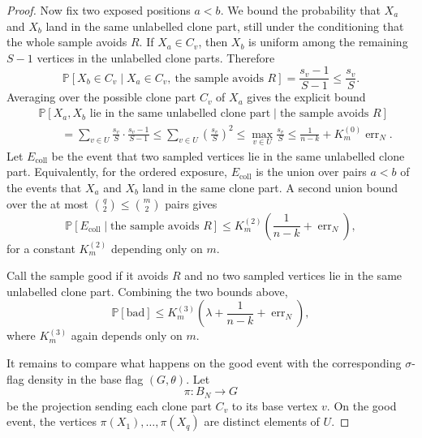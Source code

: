 \documentclass[11pt]{article}
\theoremstyle{definition}
\newcommand{\Prob}{\mathbb{P}}
\begin{document}
\begin{proof}
Now fix two exposed positions $a<b$.  We bound the probability that $X_a$ and
$X_b$ land in the same unlabelled clone part, still under the conditioning
that the whole sample avoids $R$.  If $X_a\in C_v$, then $X_b$ is uniform among
the remaining $S-1$ vertices in the unlabelled clone parts.  Therefore
\[
  \Prob[X_b\in C_v\mid X_a\in C_v,\ \text{the sample avoids }R]
  =
  \frac{s_v-1}{S-1}
  \le
  \frac{s_v}{S}.
\]
Averaging over the possible clone part $C_v$ of $X_a$ gives the explicit bound
\[
  \begin{aligned}
  &\Prob[X_a,X_b\text{ lie in the same unlabelled clone part}
        \mid \text{the sample avoids }R]  \\
  &\qquad =
  \sum_{v\in U}
    \frac{s_v}{S}\cdot\frac{s_v-1}{S-1}
  \le
  \sum_{v\in U}\left(\frac{s_v}{S}\right)^2
  \le
  \max_{v\in U}\frac{s_v}{S}
  \le
  \frac1{n-k}+K_m^{(0)}\operatorname{err}_N.
  \end{aligned}
\]
Let $E_{\mathrm{coll}}$ be the event that two sampled vertices
lie in the same unlabelled clone part.  Equivalently, for the ordered
exposure, $E_{\mathrm{coll}}$ is the union over pairs $a<b$ of the events that
$X_a$ and $X_b$ land in the same clone part.  A second union bound over the at
most $\binom q2\le\binom m2$ pairs gives
\[
  \Prob[E_{\mathrm{coll}}\mid \text{the sample avoids }R]
  \le
  K_m^{(2)}\left(\frac1{n-k}+\operatorname{err}_N\right),
\]
for a constant $K_m^{(2)}$ depending only on $m$.

Call the sample good if it avoids $R$ and no two sampled vertices lie in the same
unlabelled clone part.  Combining the two bounds above,
\[
  \Prob[\text{bad}]
  \le
  K_m^{(3)}\left(\lambda+\frac1{n-k}+\operatorname{err}_N\right),
\]
where $K_m^{(3)}$ again depends only on $m$.

It remains to compare what happens on the good event with the corresponding
$\sigma$-flag density in the base flag $(G,\theta)$.  Let
\[
  \pi:B_N\to G
\]
be the projection sending each clone part $C_v$ to its base vertex $v$.  On the
good event, the vertices $\pi(X_1),\ldots,\pi(X_q)$ are distinct elements of
$U$.


\end{proof}
\end{document}

